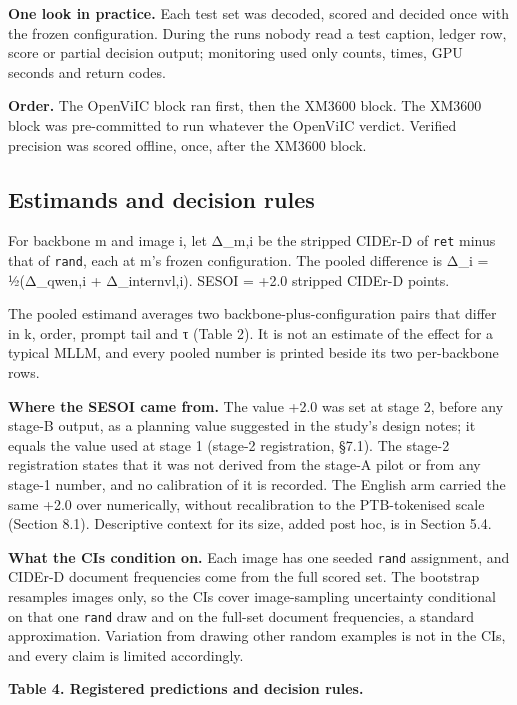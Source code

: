 \textbf{One look in practice.} Each test set was decoded, scored and decided once with the frozen
configuration. During the runs nobody read a test caption, ledger row, score or partial decision
output; monitoring used only counts, times, GPU seconds and return codes.

\textbf{Order.} The OpenViIC block ran first, then the XM3600 block. The XM3600 block was
pre-committed to run whatever the OpenViIC verdict. Verified precision was scored offline, once,
after the XM3600 block.

\subsection{Estimands and decision rules}\label{estimands-and-decision-rules}

For backbone m and image i, let Δ\_m,i be the stripped CIDEr-D of \texttt{ret} minus that of
\texttt{rand}, each at m's frozen configuration. The pooled difference is Δ\_i = ½(Δ\_qwen,i +
Δ\_internvl,i). SESOI = +2.0 stripped CIDEr-D points.

The pooled estimand averages two backbone-plus-configuration pairs that differ in k, order, prompt
tail and τ (Table 2). It is not an estimate of the effect for a typical MLLM, and every pooled
number is printed beside its two per-backbone rows.

\textbf{Where the SESOI came from.} The value +2.0 was set at stage 2, before any stage-B output, as
a planning value suggested in the study's design notes; it equals the value used at stage 1 (stage-2
registration, §7.1). The stage-2 registration states that it was not derived from the stage-A pilot
or from any stage-1 number, and no calibration of it is recorded. The English arm carried the same
+2.0 over numerically, without recalibration to the PTB-tokenised scale (Section 8.1). Descriptive
context for its size, added post hoc, is in Section 5.4.

\textbf{What the CIs condition on.} Each image has one seeded \texttt{rand} assignment, and CIDEr-D
document frequencies come from the full scored set. The bootstrap resamples images only, so the CIs
cover image-sampling uncertainty conditional on that one \texttt{rand} draw and on the full-set
document frequencies, a standard approximation. Variation from drawing other random examples is not
in the CIs, and every claim is limited accordingly.

\textbf{Table 4. Registered predictions and decision rules.}

